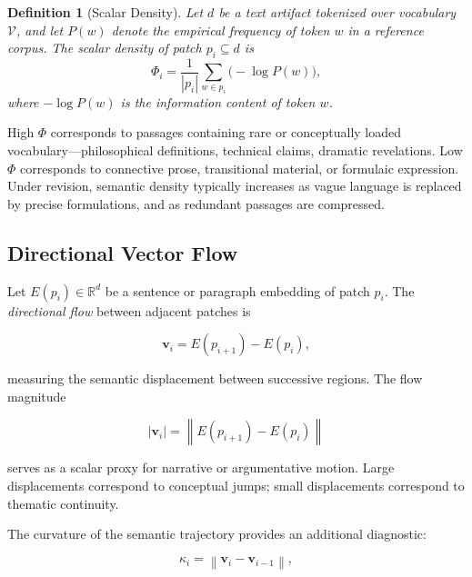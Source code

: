 \documentclass[12pt,a4paper]{article}
\theoremstyle{draftthm}
\newtheorem{definition}{Definition}[section]
\newcommand{\norm}[1]{\left\|#1\right\|}
\begin{document}
\begin{definition}[Scalar Density]
  Let $d$ be a text artifact tokenized over vocabulary $\mathcal{V}$, and let $P(w)$ denote the empirical frequency of token $w$ in a reference corpus. The \emph{scalar density} of patch $p_i \subseteq d$ is
  \begin{equation}
    \Phi_i
    =
    \frac{1}{|p_i|}
    \sum_{w \in p_i} \bigl(-\log P(w)\bigr),
    \label{eq:scalar-density}
  \end{equation}
  where $-\log P(w)$ is the information content of token $w$.
\end{definition}

High $\Phi$ corresponds to passages containing rare or conceptually loaded vocabulary---philosophical definitions, technical claims, dramatic revelations. Low $\Phi$ corresponds to connective prose, transitional material, or formulaic expression. Under revision, semantic density typically increases as vague language is replaced by precise formulations, and as redundant passages are compressed.

\subsection{Directional Vector Flow}

Let $E(p_i) \in \mathbb{R}^d$ be a sentence or paragraph embedding of patch $p_i$. The \emph{directional flow} between adjacent patches is

\begin{equation}
  \mathbf{v}_i = E(p_{i+1}) - E(p_i),
  \label{eq:vector-flow}
\end{equation}

measuring the semantic displacement between successive regions. The flow magnitude

\begin{equation}
  |\mathbf{v}_i| = \norm{E(p_{i+1}) - E(p_i)}
\end{equation}

serves as a scalar proxy for narrative or argumentative motion. Large displacements correspond to conceptual jumps; small displacements correspond to thematic continuity.

The curvature of the semantic trajectory provides an additional diagnostic:

\begin{equation}
  \kappa_i = \norm{\mathbf{v}_i - \mathbf{v}_{i-1}},
\end{equation}
\end{document}
